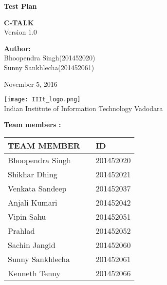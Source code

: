 \documentclass[12pt]{article}
\def\mydate{November 5, 2016}
\begin{document}
	
	\begin{titlepage}
		\begin{center}
			
			
			\LARGE{\textbf{Test Plan}}
			
			\vspace{1.5cm}
			
			\textbf{C-TALK}\\
			
			\small{Version 1.0}
			\vspace{2cm}
		 
        \large{\textbf{Author:}}
			  \large{ \\ Bhoopendra Singh(201452020) \\Sunny Sankhlecha(201452061)}	
			  
			  
			\vspace{1.5cm}
			\mydate{}
			
			
			\vspace{5cm}
			\texttt{[image: IIIt\_logo.png]} \\
			\Large{Indian Institute of Information Technology Vadodara} \\
			
		\end{center}
	\end{titlepage}
	\textbf{Team members :} \\
		\begin{center}
		
		\begin{tabular}{ |m{10em} m{8em} m{9em}|}
			\hline
			TEAM MEMBER          &   & ID        \\
			\hline
			Bhoopendra Singh     &   & 201452020 \\
			Shikhar Dhing        &   & 201452021 \\
			Venkata Sandeep      &   & 201452037 \\
			Anjali Kumari        &   & 201452042 \\
			Vipin Sahu           &   & 201452051 \\
			Prahlad              &   & 201452052 \\ 
			Sachin Jangid        &   & 201452060 \\
			Sunny Sankhlecha     &   & 201452061 \\
			Kenneth Tenny        &   & 201452066 \\
			\hline
		\end{tabular}
		
	\end{center}
	\vspace{2em}
	
\end{document}
